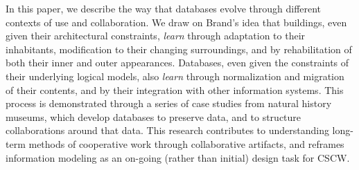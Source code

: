 In this paper, we describe the way that databases evolve through different contexts of use and collaboration. We draw on Brand's idea that buildings, even given their architectural constraints, \emph{learn} through adaptation to their inhabitants, modification to their changing surroundings, and by rehabilitation of both their inner and outer appearances. Databases, even given the constraints of their underlying logical models, also \emph{learn} through normalization and migration of their contents, and by their integration with other information systems. This process is demonstrated through a series of case studies from natural history museums, which develop databases to preserve data, and to structure collaborations around that data. This research contributes to understanding long-term methods of cooperative work through collaborative artifacts, and reframes information modeling as an on-going (rather than initial) design task for CSCW.